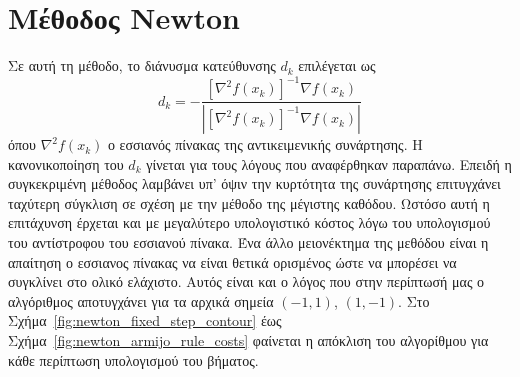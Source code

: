 \documentclass[a4paper,12pt]{article}
\begin{document}
\section*{Μέθοδος  Newton}
Σε αυτή τη μέθοδο, το διάνυσμα κατεύθυνσης $d_k$ επιλέγεται ως 
\[d_k = -\frac{[\nabla^2 f(x_k)]^{-1} \nabla f(x_k)}{|[\nabla^2 f(x_k)]^{-1} \nabla f(x_k)|}\]
όπου $\nabla^2 f(x_k)$ ο εσσιανός πίνακας της αντικειμενικής συνάρτησης. Η κανονικοποίηση του $d_k$ 
γίνεται για τους λόγους που αναφέρθηκαν παραπάνω. Επειδή η συγκεκριμένη μέθοδος λαμβάνει υπ' όψιν
την κυρτότητα της συνάρτησης επιτυγχάνει ταχύτερη σύγκλιση σε σχέση με την μέθοδο της μέγιστης καθόδου.
Ωστόσο αυτή η επιτάχυνση έρχεται και με μεγαλύτερο υπολογιστικό κόστος λόγω του υπολογισμού του αντίστροφου
του εσσιανού πίνακα. Ένα άλλο μειονέκτημα της μεθόδου είναι η απαίτηση ο εσσιανος πίνακας να είναι θετικά 
ορισμένος ώστε να μπορέσει να συγκλίνει στο ολικό ελάχιστο. Αυτός είναι και ο λόγος που στην περίπτωσή μας
ο αλγόριθμος αποτυγχάνει για τα αρχικά σημεία $(-1, 1)$, $(1, -1)$. Στο Σχήμα~\ref{fig:newton_fixed_step_contour}
έως Σχήμα~\ref{fig:newton_armijo_rule_costs} φαίνεται η απόκλιση του αλγορίθμου για κάθε περίπτωση υπολογισμού
του βήματος.
\end{document}
